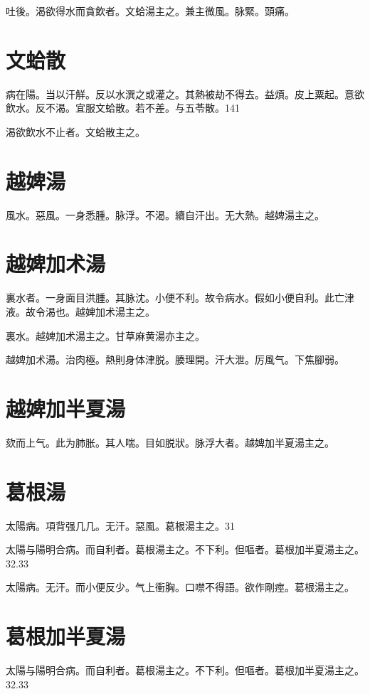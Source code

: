 \documentclass[12pt,twoside,UTF8,b5paper]{ctexbook}
\begin{document}
吐後。渴欲得水而貪飲者。文蛤湯主之。兼主微風。脉緊。頭痛。

\section{文蛤散}

病在陽。当以汗觧。反以水潠之或灌之。其熱被劫不得去。益煩。皮上粟起。意欲飲水。反不渴。宜服文蛤散。若不差。与五苓散。141

渴欲飲水不止者。文蛤散主之。

\section{越婢湯}

風水。惡風。一身悉腫。脉浮。不渴。續自汗出。无大熱。越婢湯主之。

\section{越婢加术湯}

裏水者。一身面目洪腫。其脉沈。小便不利。故令病水。假如小便自利。此亡津液。故令渴也。越婢加术湯主之。

裏水。越婢加术湯主之。甘草麻黄湯亦主之。

越婢加术湯。治肉極。熱則身体津脱。腠理開。汗大泄。厉風气。下焦腳弱。

\section{越婢加半夏湯}

欬而上气。此为肺胀。其人喘。目如脱狀。脉浮大者。越婢加半夏湯主之。

\section{葛根湯}

太陽病。項背强几几。无汗。惡風。葛根湯主之。31

太陽与陽明合病。而自利{者}。葛根湯主之。不下利。但嘔者。葛根加半夏湯主之。32.33

太陽病。无汗。而小便反少。气上衝胸。口噤不得語。欲作剛痙。葛根湯主之。

\section{葛根加半夏湯}

太陽与陽明合病。而自利{者}。葛根湯主之。不下利。但嘔者。葛根加半夏湯主之。32.33
\end{document}
